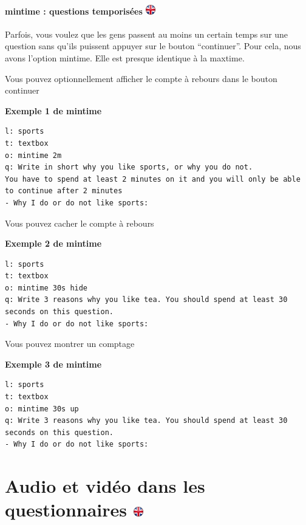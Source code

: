 \documentclass[
]{book}
\begin{document}
\hypertarget{mintime-questions-temporisuxe9es}{%
\subsubsection[mintime : questions temporisées ]{\texorpdfstring{mintime : questions temporisées \href{https://www.psytoolkit.org/doc3.1.0/online-survey-syntax.html\#mintime}{\protect\includegraphics{img/ukflag.png}}}{mintime : questions temporisées }}\label{mintime-questions-temporisuxe9es}}

Parfois, vous voulez que les gens passent au moins un certain temps sur une question sans qu'ils puissent appuyer sur le bouton ``continuer''. Pour cela, nous avons l'option mintime. Elle est presque identique à la maxtime.

Vous pouvez optionnellement afficher le compte à rebours dans le bouton continuer

\textbf{Exemple 1 de mintime}

\begin{verbatim}
l: sports
t: textbox
o: mintime 2m
q: Write in short why you like sports, or why you do not.
You have to spend at least 2 minutes on it and you will only be able to continue after 2 minutes
- Why I do or do not like sports:
\end{verbatim}

Vous pouvez cacher le compte à rebours

\textbf{Exemple 2 de mintime}

\begin{verbatim}
l: sports
t: textbox
o: mintime 30s hide
q: Write 3 reasons why you like tea. You should spend at least 30 seconds on this question.
- Why I do or do not like sports:
\end{verbatim}

Vous pouvez montrer un comptage

\textbf{Exemple 3 de mintime}

\begin{verbatim}
l: sports
t: textbox
o: mintime 30s up
q: Write 3 reasons why you like tea. You should spend at least 30 seconds on this question.
- Why I do or do not like sports:
\end{verbatim}

\hypertarget{audio-et-viduxe9o-dans-les-questionnaires}{%
\chapter[Audio et vidéo dans les questionnaires ]{\texorpdfstring{Audio et vidéo dans les questionnaires \href{https://www.psytoolkit.org/lessons/surveyaudiovideo.html}{\protect\includegraphics{img/ukflag.png}}}{Audio et vidéo dans les questionnaires }}\label{audio-et-viduxe9o-dans-les-questionnaires}}
\end{document}
